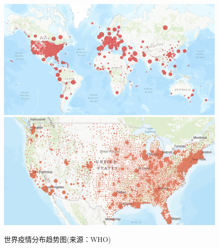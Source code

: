 \documentclass[
]{article}
\begin{document}
\begin{figure}[H]
\caption{世界疫情分布趋势图(来源：WHO)} %
\centering
\includegraphics[]{./input/covid1.png} %
\includegraphics[]{./input/covid4.png}
\label{} %
\end{figure}
\end{document}
